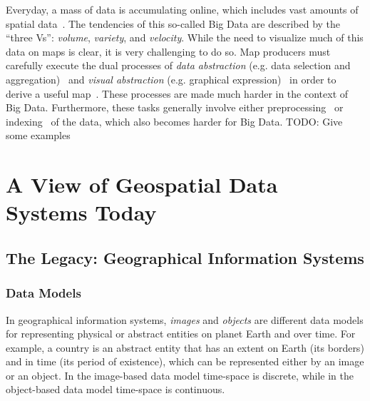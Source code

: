 \documentclass[11pt, oneside]{report}   	%
\begin{document}
Everyday, a mass of data is accumulating online, which includes vast amounts of spatial data~\cite{agrawal2012bigdata}. The tendencies of this so-called Big Data are described by the ``three Vs'': \emph{volume}, \emph{variety}, and \emph{velocity}. While the need to visualize much of this data on maps is clear, it is very challenging to do so. Map producers must carefully execute the dual processes of \emph{data abstraction} (e.g. data selection and aggregation)~\cite{haunert2006landcover,schmid2013opensciencemap} and \emph{visual abstraction} (e.g. graphical expression)~\cite{jacques1967semiologie} in order to derive a useful map~\cite{stolte2003multiscale,weibel1999generalising}. These processes are made much harder in the context of Big Data. Furthermore, these tasks generally involve either preprocessing~\cite{sarma2012fusiontables,kefaloukos2014declarative} or indexing~\cite{bereuter2013real,nutanong2012multiresolution} of the data, which also becomes harder for Big Data. TODO: Give some examples

\section{A View of Geospatial Data Systems Today}


\subsection{The Legacy: Geographical Information Systems}

\subsubsection{Data Models}
In geographical information systems, \emph{images} and \emph{objects} are different data models for representing physical or abstract entities on planet Earth and over time. For example, a country is an abstract entity that has an extent on Earth (its borders) and in time (its period of existence), which can be represented either by an image or an object. In the image-based data model time-space is discrete, while in the object-based data model time-space is continuous.
\end{document}
